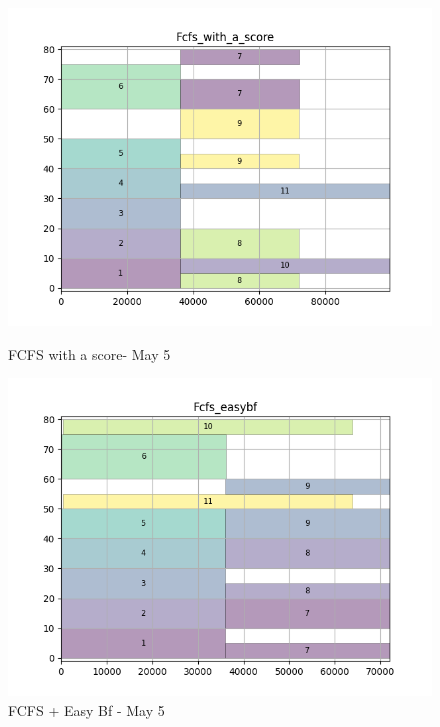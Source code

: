 \documentclass[a4paper]{article}
\begin{document}
\begin{figure}[H]
\begin{minipage}[b]{0.5\linewidth}
  \end{minipage}
  \begin{minipage}[b]{0.5\linewidth}
    \centering
    \includegraphics[width=1.11\linewidth]{MBSS/plot/Gantt_charts/test/Fcfs_with_a_score.png} 
    \caption{FCFS with a score- May 5} 
    \vspace{4ex}
  \end{minipage}%
  \begin{minipage}[b]{0.5\linewidth}
    \centering
    \includegraphics[width=1.11\linewidth]{MBSS/plot/Gantt_charts/test/Fcfs_easybf.png} 
    \caption{FCFS + Easy Bf - May 5} 
    \vspace{4ex}
  \end{minipage}
  \begin{minipage}[b]{0.5\linewidth}

\end{minipage}
\end{figure}
\end{document}
